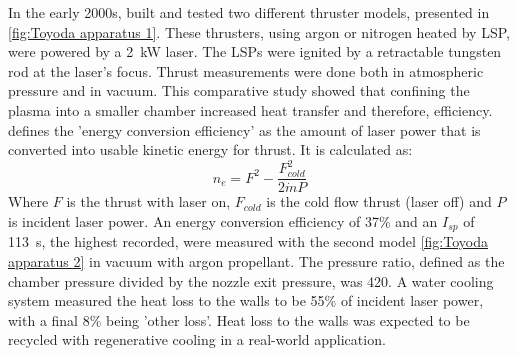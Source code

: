         In the early 2000s, \textcite{toyodaThrustPerformanceCW2002} built and tested two different thruster models, presented in \autoref{fig:Toyoda apparatus 1}. These thrusters, using argon or nitrogen heated by LSP, were powered by a \qty{2}{kW}  laser. The LSPs were ignited by a retractable tungsten rod at the laser's focus. Thrust measurements were done both in atmospheric pressure and in vacuum. This comparative study showed that confining the plasma into a smaller chamber increased heat transfer and therefore, efficiency. \textcite{toyodaThrustPerformanceCW2002} defines the 'energy conversion efficiency' as the amount of laser power that is converted into usable kinetic energy for thrust. It is calculated as:
        \[ n_e = F^2 - \frac{F^2_{cold}}{2 \dot{m} P}\]
        Where $F$ is the thrust with laser on, $F_{cold}$ is the cold flow thrust (laser off) and $P$ is incident laser power. An energy conversion efficiency of 37\% and an $I_{sp}$ of \qty{113}{s}, the highest recorded, were measured with the second model \autoref{fig:Toyoda apparatus 2} in vacuum with argon propellant. The pressure ratio, defined as the chamber pressure divided by the nozzle exit pressure, was 420. A water cooling system measured the heat loss to the walls to be 55\% of incident laser power, with a final 8\% being 'other loss'. Heat loss to the walls was expected to be recycled with regenerative cooling in a real-world application.

